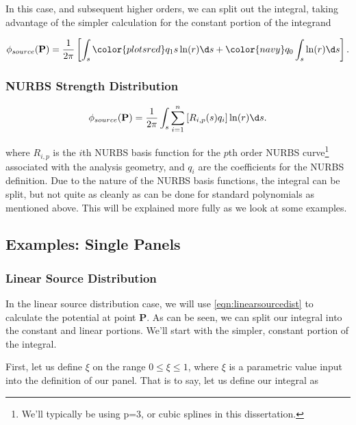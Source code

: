 \noindent In this case, and subsequent higher orders, we can split out the integral, taking advantage of the simpler calculation for the constant portion of the integrand

\begin{equation}
\label{eqn:linearsourcedist}
	\phi_{source}(\mathbf{P}) = \frac{1}{2\pi} \left[ \int_s {\color{plotsred}q_1}s \ln(r) \d s + {\color{navy}q_0} \int_s \ln(r) \d s \right].
\end{equation}


\subsubsection{NURBS Strength Distribution}


\begin{equation}
\label{eqn:nurbssourcedist}
	\phi_{source}(\mathbf{P}) = \frac{1}{2\pi} \int_s \sum_{i=1}^n  \left[ R_{i,p}(s) q_i \right] \ln(r) \d s.
\end{equation}

\noindent where \(R_{i,p}\) is the \(i\)th NURBS basis function for the \(p\)th order NURBS curve\footnote{We'll typically be using p=3, or cubic splines in this dissertation.} associated with the analysis geometry, and \(q_i\) are the coefficients for the NURBS definition.
Due to the nature of the NURBS basis functions, the integral can be split, but not quite as cleanly as can be done for standard polynomials as mentioned above.
This will be explained more fully as we look at some examples.

\subsection{Examples: Single Panels}


\subsubsection{Linear Source Distribution}


In the linear source distribution case, we will use \cref{eqn:linearsourcedist} to calculate the potential at point \(\mathbf{P}\).
As can be seen, we can split our integral into the constant and linear portions.
We'll start with the simpler, constant portion of the integral.

First, let us define \(\xi\) on the range \(0 \leq \xi \leq 1\), where \(\xi\) is a parametric value input into the definition of our panel.
That is to say, let us define our integral as

